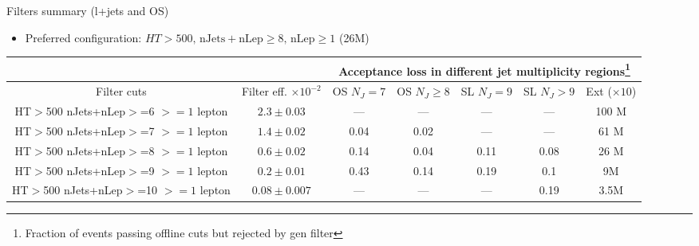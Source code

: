 \documentclass[xcolor=table]{beamer}
\begin{document}
\begin{frame}{Filters summary  (l+jets and OS)}
\begin{itemize}
\item{\footnotesize  Preferred configuration: $HT>500,\, \mathrm{nJets+nLep}\geq8,\,  \mathrm{nLep}\geq1$ (26M)}
\end{itemize}
\vspace{-19pt}
\begin{center}
{\tiny \begin{tabular}{|c|c|c|c|c|c|c|}
            \cline{1-7}
             & & \multicolumn{5}{|c|}{Acceptance loss in different jet multiplicity regions\footnote{Fraction of events passing offline cuts but rejected by gen filter}}\\
            \cline{1-7}
\hline Filter cuts & Filter eff. $\times 10^{-2}$ & OS $N_J=7$& OS $N_J\geq8$ & SL $N_J=9$& SL $N_J>9$& Ext ($\times 10$) \\ 
\hline \thead{{\tiny HT$>$500} \\ {\tiny  nJets+nLep$>$=6} \\ {\tiny $>=1$ lepton}} & $2.3 \pm 0.03$  & --- & --- & --- & --- & 100 M\\
\hline \thead{{\tiny HT$>$500} \\ {\tiny  nJets+nLep$>$=7} \\ {\tiny $>=1$ lepton}} & $1.4 \pm 0.02$  & 0.04 & 0.02 & --- & --- & 61 M\\
\hline \rowcolor{lightgray} \thead{{\tiny HT$>$500} \\{\tiny nJets+nLep$>$=8} \\ {\tiny $>=1$ lepton}} & $0.6 \pm 0.02$  & 0.14 & 0.04 & 0.11 & 0.08 & 26 M\\ 
\hline \thead{{\tiny HT$>$500} \\ {\tiny nJets+nLep$>$=9} \\ {\tiny $>=1$ lepton}} & $0.2 \pm 0.01$   & 0.43 & 0.14 & 0.19 & 0.1 & 9M\\ 
\hline \thead{{\tiny HT$>$500} \\ {\tiny nJets+nLep$>$=10} \\ {\tiny $>=1$ lepton}} & $0.08 \pm 0.007$   & --- & --- & --- & 0.19 & 3.5M\\
\hline 
\end{tabular} }
\end{center}
\end{frame}
\end{document}
